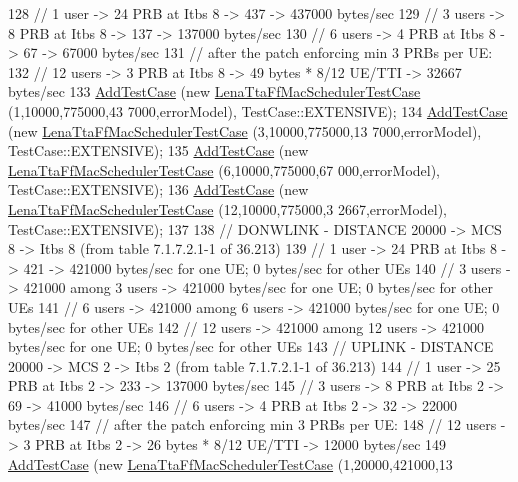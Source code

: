 \begin{DoxyCode}
128   \textcolor{comment}{// 1 user -> 24 PRB at Itbs 8 -> 437 -> 437000 bytes/sec}
129   \textcolor{comment}{// 3 users -> 8 PRB at Itbs 8 -> 137 -> 137000 bytes/sec}
130   \textcolor{comment}{// 6 users -> 4 PRB at Itbs 8 -> 67 -> 67000 bytes/sec}
131   \textcolor{comment}{// after the patch enforcing min 3 PRBs per UE:}
132   \textcolor{comment}{// 12 users -> 3 PRB at Itbs 8 -> 49 bytes * 8/12 UE/TTI -> 32667 bytes/sec}
133   \hyperlink{classns3_1_1TestCase_a3718088e3eefd5d6454569d2e0ddd835}{AddTestCase} (\textcolor{keyword}{new} \hyperlink{classLenaTtaFfMacSchedulerTestCase}{LenaTtaFfMacSchedulerTestCase} (1,10000,775000,43
      7000,errorModel), TestCase::EXTENSIVE);
134   \hyperlink{classns3_1_1TestCase_a3718088e3eefd5d6454569d2e0ddd835}{AddTestCase} (\textcolor{keyword}{new} \hyperlink{classLenaTtaFfMacSchedulerTestCase}{LenaTtaFfMacSchedulerTestCase} (3,10000,775000,13
      7000,errorModel), TestCase::EXTENSIVE);
135   \hyperlink{classns3_1_1TestCase_a3718088e3eefd5d6454569d2e0ddd835}{AddTestCase} (\textcolor{keyword}{new} \hyperlink{classLenaTtaFfMacSchedulerTestCase}{LenaTtaFfMacSchedulerTestCase} (6,10000,775000,67
      000,errorModel), TestCase::EXTENSIVE);
136   \hyperlink{classns3_1_1TestCase_a3718088e3eefd5d6454569d2e0ddd835}{AddTestCase} (\textcolor{keyword}{new} \hyperlink{classLenaTtaFfMacSchedulerTestCase}{LenaTtaFfMacSchedulerTestCase} (12,10000,775000,3
      2667,errorModel), TestCase::EXTENSIVE);
137  
138   \textcolor{comment}{// DONWLINK - DISTANCE 20000 -> MCS 8 -> Itbs 8 (from table 7.1.7.2.1-1 of 36.213)}
139   \textcolor{comment}{// 1 user -> 24 PRB at Itbs 8 -> 421 -> 421000 bytes/sec for one UE; 0 bytes/sec for other UEs}
140   \textcolor{comment}{// 3 users -> 421000 among 3 users -> 421000 bytes/sec for one UE; 0 bytes/sec for other UEs}
141   \textcolor{comment}{// 6 users -> 421000 among 6 users -> 421000 bytes/sec for one UE; 0 bytes/sec for other UEs}
142   \textcolor{comment}{// 12 users -> 421000 among 12 users -> 421000 bytes/sec for one UE; 0 bytes/sec for other UEs}
143   \textcolor{comment}{// UPLINK - DISTANCE 20000 -> MCS 2 -> Itbs 2 (from table 7.1.7.2.1-1 of 36.213)}
144   \textcolor{comment}{// 1 user -> 25 PRB at Itbs 2 -> 233 -> 137000 bytes/sec}
145   \textcolor{comment}{// 3 users -> 8 PRB at Itbs 2 -> 69 -> 41000 bytes/sec}
146   \textcolor{comment}{// 6 users -> 4 PRB at Itbs 2 -> 32 -> 22000 bytes/sec}
147   \textcolor{comment}{// after the patch enforcing min 3 PRBs per UE:}
148   \textcolor{comment}{// 12 users -> 3 PRB at Itbs 2 -> 26 bytes * 8/12 UE/TTI -> 12000 bytes/sec}
149   \hyperlink{classns3_1_1TestCase_a3718088e3eefd5d6454569d2e0ddd835}{AddTestCase} (\textcolor{keyword}{new} \hyperlink{classLenaTtaFfMacSchedulerTestCase}{LenaTtaFfMacSchedulerTestCase} (1,20000,421000,13

\end{DoxyCode}
